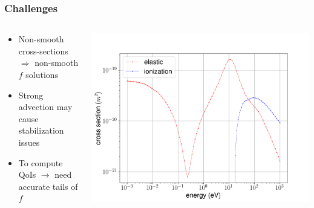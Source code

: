 \documentclass[mathserif, aspectratio=169]{beamer}
\begin{document}
\begin{frame}
	\frametitle{Challenges}
	\begin{columns}
		\begin{column}{0.3\textwidth}
			\begin{itemize}
				\item Non-smooth cross-sections $\Rightarrow$ non-smooth $f$ solutions
				\item Strong advection may cause stabilization issues
				\item To compute QoIs $\rightarrow$ need accurate tails of $f$ 
			\end{itemize}
		\end{column}
		\begin{column}{0.7\textwidth}
			\vspace*{-0.8in}
			\begin{center}
				\includegraphics[width=\columnwidth]{g0_g2_cs.png}
			\end{center}
		\end{column}
	\end{columns}
\end{frame}
\end{document}
